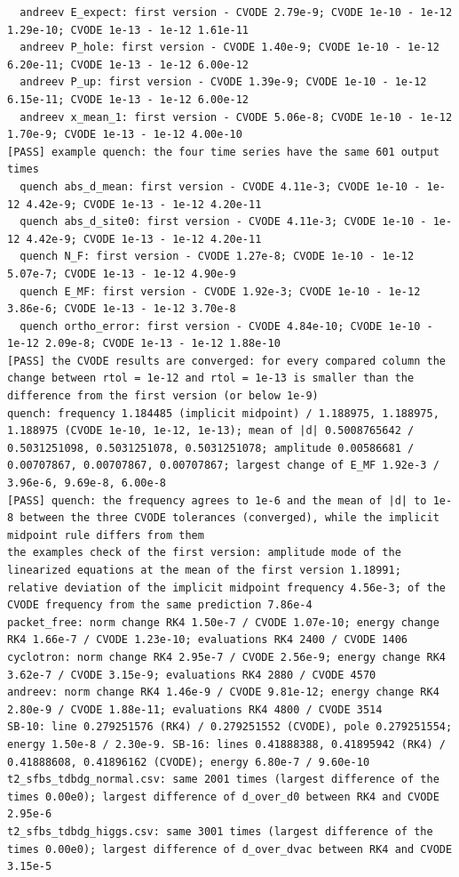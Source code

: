 \documentclass[
  10pt,
]{article}
\begin{document}
\begin{verbatim}
  andreev E_expect: first version - CVODE 2.79e-9; CVODE 1e-10 - 1e-12 1.29e-10; CVODE 1e-13 - 1e-12 1.61e-11
  andreev P_hole: first version - CVODE 1.40e-9; CVODE 1e-10 - 1e-12 6.20e-11; CVODE 1e-13 - 1e-12 6.00e-12
  andreev P_up: first version - CVODE 1.39e-9; CVODE 1e-10 - 1e-12 6.15e-11; CVODE 1e-13 - 1e-12 6.00e-12
  andreev x_mean_1: first version - CVODE 5.06e-8; CVODE 1e-10 - 1e-12 1.70e-9; CVODE 1e-13 - 1e-12 4.00e-10
[PASS] example quench: the four time series have the same 601 output times
  quench abs_d_mean: first version - CVODE 4.11e-3; CVODE 1e-10 - 1e-12 4.42e-9; CVODE 1e-13 - 1e-12 4.20e-11
  quench abs_d_site0: first version - CVODE 4.11e-3; CVODE 1e-10 - 1e-12 4.42e-9; CVODE 1e-13 - 1e-12 4.20e-11
  quench N_F: first version - CVODE 1.27e-8; CVODE 1e-10 - 1e-12 5.07e-7; CVODE 1e-13 - 1e-12 4.90e-9
  quench E_MF: first version - CVODE 1.92e-3; CVODE 1e-10 - 1e-12 3.86e-6; CVODE 1e-13 - 1e-12 3.70e-8
  quench ortho_error: first version - CVODE 4.84e-10; CVODE 1e-10 - 1e-12 2.09e-8; CVODE 1e-13 - 1e-12 1.88e-10
[PASS] the CVODE results are converged: for every compared column the change between rtol = 1e-12 and rtol = 1e-13 is smaller than the difference from the first version (or below 1e-9)
quench: frequency 1.184485 (implicit midpoint) / 1.188975, 1.188975, 1.188975 (CVODE 1e-10, 1e-12, 1e-13); mean of |d| 0.5008765642 / 0.5031251098, 0.5031251078, 0.5031251078; amplitude 0.00586681 / 0.00707867, 0.00707867, 0.00707867; largest change of E_MF 1.92e-3 / 3.96e-6, 9.69e-8, 6.00e-8
[PASS] quench: the frequency agrees to 1e-6 and the mean of |d| to 1e-8 between the three CVODE tolerances (converged), while the implicit midpoint rule differs from them
the examples check of the first version: amplitude mode of the linearized equations at the mean of the first version 1.18991; relative deviation of the implicit midpoint frequency 4.56e-3; of the CVODE frequency from the same prediction 7.86e-4
packet_free: norm change RK4 1.50e-7 / CVODE 1.07e-10; energy change RK4 1.66e-7 / CVODE 1.23e-10; evaluations RK4 2400 / CVODE 1406
cyclotron: norm change RK4 2.95e-7 / CVODE 2.56e-9; energy change RK4 3.62e-7 / CVODE 3.15e-9; evaluations RK4 2880 / CVODE 4570
andreev: norm change RK4 1.46e-9 / CVODE 9.81e-12; energy change RK4 2.80e-9 / CVODE 1.88e-11; evaluations RK4 4800 / CVODE 3514
SB-10: line 0.279251576 (RK4) / 0.279251552 (CVODE), pole 0.279251554; energy 1.50e-8 / 2.30e-9. SB-16: lines 0.41888388, 0.41895942 (RK4) / 0.41888608, 0.41896162 (CVODE); energy 6.80e-7 / 9.60e-10
t2_sfbs_tdbdg_normal.csv: same 2001 times (largest difference of the times 0.00e0); largest difference of d_over_d0 between RK4 and CVODE 2.95e-6
t2_sfbs_tdbdg_higgs.csv: same 3001 times (largest difference of the times 0.00e0); largest difference of d_over_dvac between RK4 and CVODE 3.15e-5
\end{verbatim}
\end{document}
